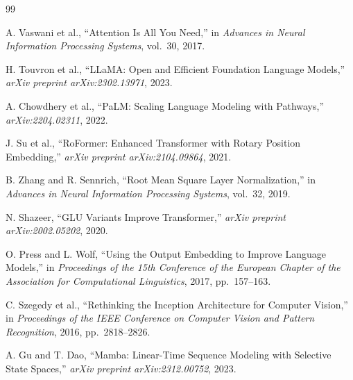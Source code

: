 \documentclass[11pt,a4paper]{article}
\numberwithin{equation}{section}
\begin{document}
\begin{thebibliography}{99}

A. Vaswani et al., ``Attention Is All You Need,'' in \emph{Advances in Neural Information Processing Systems}, vol.~30, 2017.

H. Touvron et al., ``LLaMA: Open and Efficient Foundation Language Models,'' \emph{arXiv preprint arXiv:2302.13971}, 2023.

A. Chowdhery et al., ``PaLM: Scaling Language Modeling with Pathways,'' \emph{arXiv:2204.02311}, 2022.

J. Su et al., ``RoFormer: Enhanced Transformer with Rotary Position Embedding,'' \emph{arXiv preprint arXiv:2104.09864}, 2021.

B. Zhang and R. Sennrich, ``Root Mean Square Layer Normalization,'' in \emph{Advances in Neural Information Processing Systems}, vol.~32, 2019.

N. Shazeer, ``GLU Variants Improve Transformer,'' \emph{arXiv preprint arXiv:2002.05202}, 2020.

O. Press and L. Wolf, ``Using the Output Embedding to Improve Language Models,'' in \emph{Proceedings of the 15th Conference of the European Chapter of the Association for Computational Linguistics}, 2017, pp.~157--163.

C. Szegedy et al., ``Rethinking the Inception Architecture for Computer Vision,'' in \emph{Proceedings of the IEEE Conference on Computer Vision and Pattern Recognition}, 2016, pp.~2818--2826.

A. Gu and T. Dao, ``Mamba: Linear-Time Sequence Modeling with Selective State Spaces,'' \emph{arXiv preprint arXiv:2312.00752}, 2023.

\end{thebibliography}
\end{document}
